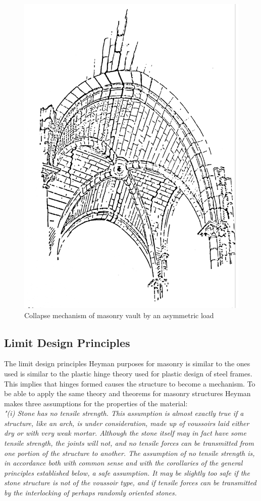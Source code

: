 \begin{figure}[H] 
\centering
\includegraphics[width=0.5\linewidth ]{figure/Theory/cracksHeyman.pdf}
\caption{Collapse mechanism of masonry vault by an asymmetric load}
\end{figure}

\subsection{Limit Design Principles}

The limit design principles Heyman purposes for masonry is similar to the ones used is similar to the plastic hinge theory used for plastic design of steel frames. This implies that hinges formed causes the structure to become a mechanism. To be able to apply the same theory and theorems for masonry structures Heyman makes three assumptions for the properties of the material:\\



\textit{"(i) Stone has no tensile strength. This assumption is almost exactly true if a structure,
like an arch, is under consideration, made up of voussoirs laid either dry or with very
weak mortar. Although the stone itself may in fact have some tensile strength, the joints
will not, and no tensile forces can be transmitted from one portion of the structure to
another. The assumption of no tensile strength is, in accordance both with common sense
and with the corollaries of the general principles established below, a safe assumption.
It may be slightly too safe if the stone structure is not of the voussoir type, and if tensile
forces can be transmitted by the interlocking of perhaps randomly oriented stones.}

